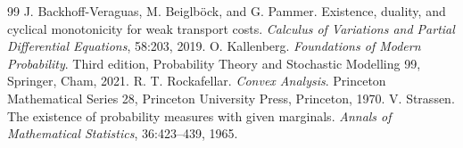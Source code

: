 \documentclass[10pt,a4paper]{amsart}
\begin{document}
\begin{thebibliography}{99}
 J. Backhoff-Veraguas, M. Beiglb\"ock, and G. Pammer. Existence, duality, and cyclical monotonicity for weak transport costs. \emph{Calculus of Variations and Partial Differential Equations}, 58:203, 2019.
 O. Kallenberg. \emph{Foundations of Modern Probability}. Third edition, Probability Theory and Stochastic Modelling 99, Springer, Cham, 2021.
 R. T. Rockafellar. \emph{Convex Analysis}. Princeton Mathematical Series 28, Princeton University Press, Princeton, 1970.
 V. Strassen. The existence of probability measures with given marginals. \emph{Annals of Mathematical Statistics}, 36:423--439, 1965.
\end{thebibliography}
\end{document}
